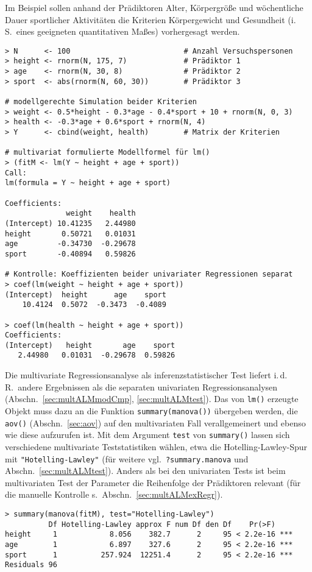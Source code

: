 Im Beispiel sollen anhand der Prädiktoren Alter, Körpergröße und wöchentliche Dauer sportlicher Aktivitäten die Kriterien Körpergewicht und Gesundheit (i.\,S.\ eines geeigneten quantitativen Maßes) vorhergesagt werden.
\begin{lstlisting}
> N      <- 100                          # Anzahl Versuchspersonen
> height <- rnorm(N, 175, 7)             # Prädiktor 1
> age    <- rnorm(N, 30, 8)              # Prädiktor 2
> sport  <- abs(rnorm(N, 60, 30))        # Prädiktor 3

# modellgerechte Simulation beider Kriterien
> weight <- 0.5*height - 0.3*age - 0.4*sport + 10 + rnorm(N, 0, 3)
> health <- -0.3*age + 0.6*sport + rnorm(N, 4)
> Y      <- cbind(weight, health)        # Matrix der Kriterien

# multivariat formulierte Modellformel für lm()
> (fitM <- lm(Y ~ height + age + sport))
Call:
lm(formula = Y ~ height + age + sport)

Coefficients:
              weight    health
(Intercept) 10.41235   2.44980
height       0.50721   0.01031
age         -0.34730  -0.29678
sport       -0.40894   0.59826

# Kontrolle: Koeffizienten beider univariater Regressionen separat
> coef(lm(weight ~ height + age + sport))
(Intercept)  height      age    sport
    10.4124  0.5072  -0.3473  -0.4089

> coef(lm(health ~ height + age + sport))
Coefficients:
(Intercept)   height       age    sport
   2.44980   0.01031  -0.29678  0.59826
\end{lstlisting}

Die multivariate Regressionsanalyse als inferenzstatistischer Test liefert i.\,d.\,R.\ andere Ergebnissen als die separaten univariaten Regressionsanalysen (Abschn.\ \ref{sec:multALMmodCmp}, \ref{sec:multALMtest}). Das von \lstinline!lm()! erzeugte Objekt muss dazu an die Funktion \lstinline!summary(manova())! übergeben werden, die \lstinline!aov()! (Abschn.\ \ref{sec:aov}) auf den multivariaten Fall verallgemeinert und ebenso wie diese aufzurufen ist. Mit dem Argument \lstinline!test! von \lstinline!summary()! lassen sich verschiedene multivariate Teststatistiken wählen, etwa die Hotelling-Lawley-Spur mit \lstinline!"Hotelling-Lawley"! (für weitere vgl.\ \lstinline!?summary.manova! und Abschn.\ \ref{sec:multALMtest}). Anders als bei den univariaten Tests ist beim multivariaten Test der Parameter die Reihenfolge der Prädiktoren relevant (für die manuelle Kontrolle s.\ Abschn.\ \ref{sec:multALMexRegr}).
\begin{lstlisting}
> summary(manova(fitM), test="Hotelling-Lawley")
          Df Hotelling-Lawley approx F num Df den Df    Pr(>F)
height     1            8.056    382.7      2     95 < 2.2e-16 ***
age        1            6.897    327.6      2     95 < 2.2e-16 ***
sport      1          257.924  12251.4      2     95 < 2.2e-16 ***
Residuals 96
\end{lstlisting}

